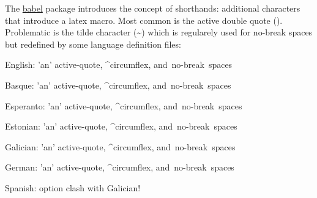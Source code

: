 \documentclass[a4paper]{article}
\begin{document}
The \href{http://www.ctan.org/packages/babel}{babel} package introduces the concept of \textquotedbl{}shorthands\textquotedbl{}: additional
characters that introduce a latex macro. Most common is the active double
quote (\textquotedbl{}). Problematic is the tilde character (\textasciitilde{}) which is regularely used
for no-break spaces but redefined by some language definition files:

English: 'an' \textquotedbl{}active\textquotedbl{}-quote, \textasciicircum{}circumflex, and no-break spaces

\foreignlanguage{basque}{Basque: 'an' \textquotedbl{}active\textquotedbl{}-quote, \textasciicircum{}circumflex, and no-break spaces}

\foreignlanguage{esperanto}{Esperanto: 'an' \textquotedbl{}active\textquotedbl{}-quote, \textasciicircum{}circumflex, and no-break spaces}

\foreignlanguage{estonian}{Estonian: 'an' \textquotedbl{}active\textquotedbl{}-quote, \textasciicircum{}circumflex, and no-break spaces}

\foreignlanguage{galician}{Galician: 'an' \textquotedbl{}active\textquotedbl{}-quote, \textasciicircum{}circumflex, and no-break spaces}

\foreignlanguage{ngerman}{German: 'an' \textquotedbl{}active\textquotedbl{}-quote, \textasciicircum{}circumflex, and no-break spaces}

Spanish: option clash with Galician!

% 
\end{document}
